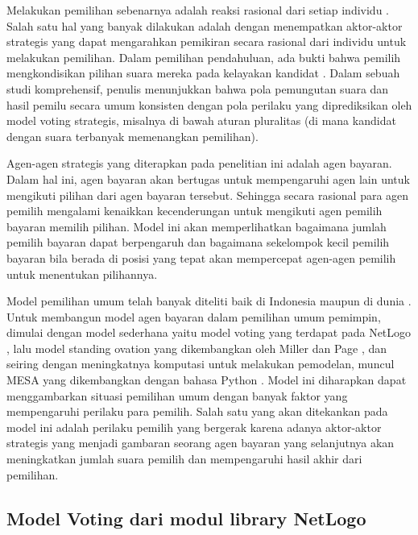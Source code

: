 Melakukan pemilihan sebenarnya adalah reaksi rasional dari setiap individu \cite{feddersen2004rational}. Salah satu hal yang banyak dilakukan adalah dengan menempatkan aktor-aktor strategis yang dapat mengarahkan pemikiran secara rasional dari individu untuk melakukan pemilihan. Dalam pemilihan pendahuluan, ada bukti bahwa pemilih mengkondisikan pilihan suara mereka pada kelayakan kandidat \cite{abramson1992sophisticated}. Dalam sebuah studi komprehensif, penulis \cite{cox1997making} menunjukkan bahwa pola pemungutan suara dan hasil pemilu secara umum konsisten dengan pola perilaku yang diprediksikan oleh model voting strategis, misalnya di bawah aturan pluralitas (di mana kandidat dengan suara terbanyak memenangkan pemilihan).

Agen-agen strategis yang diterapkan pada penelitian ini adalah agen bayaran. Dalam hal ini, agen bayaran akan bertugas untuk mempengaruhi agen lain untuk mengikuti pilihan dari agen bayaran tersebut. Sehingga secara rasional para agen pemilih mengalami kenaikkan kecenderungan untuk mengikuti agen pemilih bayaran memilih pilihan. Model ini akan memperlihatkan bagaimana jumlah pemilih bayaran dapat berpengaruh dan bagaimana sekelompok kecil pemilih bayaran bila berada di posisi yang tepat akan mempercepat agen-agen pemilih untuk menentukan pilihannya.

Model pemilihan umum telah banyak diteliti baik di Indonesia maupun di dunia \cite{abramson1992sophisticated,cox1997making,wijayati2020money}. Untuk membangun model agen bayaran dalam pemilihan umum pemimpin, dimulai dengan model sederhana yaitu model voting yang terdapat pada NetLogo \cite{wilensky1999netlogo}, lalu model standing ovation yang dikembangkan oleh Miller dan Page \cite{miller2004standing}, dan seiring dengan meningkatnya komputasi untuk melakukan pemodelan, muncul MESA yang dikembangkan dengan bahasa Python \cite{kazil2020utilizing}. Model ini diharapkan dapat menggambarkan situasi pemilihan umum dengan banyak faktor yang mempengaruhi perilaku para pemilih. Salah satu yang akan ditekankan pada model ini adalah perilaku pemilih yang bergerak karena adanya aktor-aktor strategis yang menjadi gambaran seorang agen bayaran yang selanjutnya akan meningkatkan jumlah suara pemilih dan mempengaruhi hasil akhir dari pemilihan.

\subsection{Model Voting dari modul library NetLogo}

